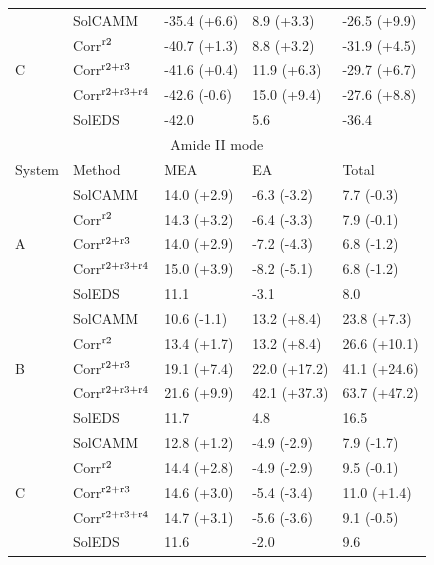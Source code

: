\documentclass[a4paper,titlepage,twoside,fleqn,12pt]{book}
\begin{document}
\begin{appendices}
\begin{table}[ht]
\begin{tabular*}{1.0\textwidth}{@{\extracolsep{\fill} } l ll ll}
\hline
\multirow{5}{*}{C}   & SolCAMM   & -35.4 (+6.6)  & 8.9 (+3.3) & -26.5 (+9.9) \\
        & Corr$^{\rm r2}$        & -40.7 (+1.3)  & 8.8 (+3.2) & -31.9 (+4.5) \\
        & Corr$^{\rm r2+r3}$     & -41.6 (+0.4)  &11.9 (+6.3) & -29.7 (+6.7) \\
        & Corr$^{\rm r2+r3+r4}$  & -42.6 (-0.6)  &15.0 (+9.4) & -27.6 (+8.8) \\
                     & SolEDS    & -42.0         & 5.6        & -36.4        \\
\hline\hline
\multicolumn{5}{c}{Amide II mode} \\
\hline
System               & Method    & MEA           & EA         & Total        \\
\hline
\multirow{5}{*}{A}   & SolCAMM   & 14.0 (+2.9)   & -6.3 (-3.2)& 7.7 (-0.3)   \\
        & Corr$^{\rm r2}$        & 14.3 (+3.2)   & -6.4 (-3.3)& 7.9 (-0.1)   \\
        & Corr$^{\rm r2+r3}$     & 14.0 (+2.9)   & -7.2 (-4.3)& 6.8 (-1.2)   \\
        & Corr$^{\rm r2+r3+r4}$  & 15.0 (+3.9)   & -8.2 (-5.1)& 6.8 (-1.2)   \\
                     & SolEDS    & 11.1          & -3.1       & 8.0          \\
\hline
\multirow{5}{*}{B}   & SolCAMM   & 10.6 (-1.1)   & 13.2 (+8.4)& 23.8 (+7.3)  \\
        & Corr$^{\rm r2}$        & 13.4 (+1.7)   & 13.2 (+8.4)& 26.6 (+10.1) \\
        & Corr$^{\rm r2+r3}$     & 19.1 (+7.4)   & 22.0 (+17.2)&41.1 (+24.6) \\
        & Corr$^{\rm r2+r3+r4}$  & 21.6 (+9.9)   & 42.1 (+37.3)&63.7 (+47.2) \\
                     & SolEDS    & 11.7          & 4.8        & 16.5         \\
\hline
\multirow{5}{*}{C}   & SolCAMM   & 12.8 (+1.2)   & -4.9 (-2.9)& 7.9 (-1.7)   \\
        & Corr$^{\rm r2}$        & 14.4 (+2.8)   & -4.9 (-2.9)& 9.5 (-0.1)   \\
        & Corr$^{\rm r2+r3}$     & 14.6 (+3.0)   & -5.4 (-3.4)&11.0 (+1.4)   \\
        & Corr$^{\rm r2+r3+r4}$  & 14.7 (+3.1)   & -5.6 (-3.6)& 9.1 (-0.5)   \\
                     & SolEDS    & 11.6          & -2.0       & 9.6          \\
\hline\hline
\end{tabular*}
\end{table}

\end{appendices}
\end{document}
